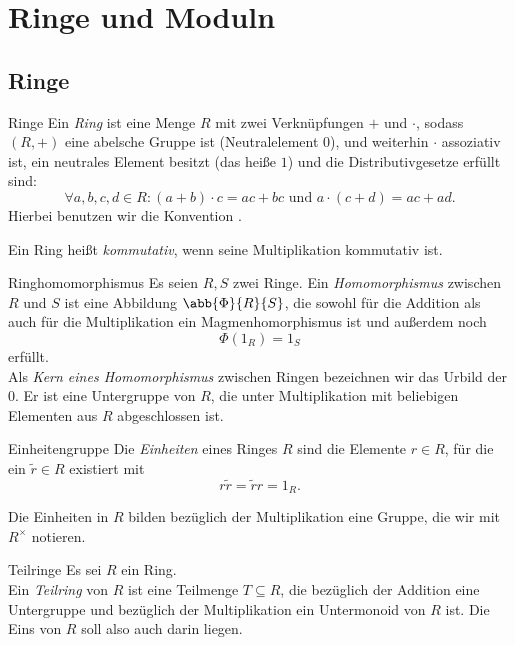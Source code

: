 \section{Ringe und Moduln}

\subsection{Ringe}

\begin{karte}{Ringe}
    Ein \textit{Ring} ist eine Menge \(R\) mit zwei 
    Verknüpfungen \(+\) und \(\cdot\), sodass \((R,+)\) 
    eine abelsche Gruppe ist (Neutralelement \(0\)), 
    und weiterhin \(\cdot\) assoziativ ist, 
    ein neutrales Element besitzt (das heiße \(1\)) 
    und die Distributivgesetze erfüllt sind: 
    \[ \forall a,b,c,d\in R: (a+b) \cdot c = ac + bc \text{ und } 
    a \cdot (c+d) = ac+ad. \]
    Hierbei benutzen wir die Konvention .

    Ein Ring heißt \textit{kommutativ}, wenn seine Multiplikation 
    kommutativ ist. 
\end{karte}

\begin{karte}{Ringhomomorphismus}
    Es seien \(R,S\) zwei Ringe. Ein \textit{Homomorphismus} 
    zwischen \(R\) und \(S\) ist eine Abbildung 
    \( \abb{\Phi}{R}{S} \), die sowohl für die Addition 
    als auch für die Multiplikation ein 
    Magmenhomorphismus ist und außerdem noch 
    \[ \Phi(1_R) = 1_S \]
    erfüllt.\\
    Als \textit{Kern eines Homomorphismus} zwischen Ringen 
    bezeichnen wir das Urbild der \(0\). Er ist eine 
    Untergruppe von \(R\), die unter Multiplikation mit 
    beliebigen Elementen aus \(R\) abgeschlossen ist.
\end{karte}

\begin{karte}{Einheitengruppe}
    Die \textit{Einheiten} eines Ringes \(R\) 
    sind die Elemente \(r\in R\), für die ein 
    \( \tilde{r}\in R \) existiert mit 
    \[ r \tilde{r} = \tilde{r} r = 1_R. \]

    Die Einheiten in \(R\) bilden bezüglich der 
    Multiplikation eine Gruppe, die wir 
    mit \(R^\times\) notieren.
\end{karte}

\begin{karte}{Teilringe}
    Es sei \(R\) ein Ring.\\
    Ein \textit{Teilring} von \(R\) ist eine Teilmenge 
    \( T\subseteq R \), die bezüglich der Addition eine 
    Untergruppe und bezüglich der Multiplikation ein 
    Untermonoid von \(R\) ist. Die Eins von \(R\) 
    soll also auch darin liegen.
\end{karte}

